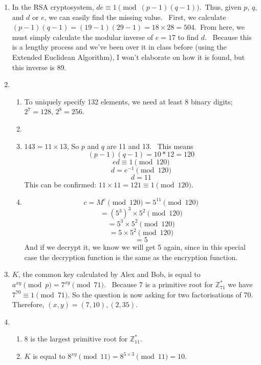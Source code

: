 \documentclass[12pt,letterpaper]{article}
\begin{document}
\pagestyle{fancy}
\rhead{\today}

\begin{enumerate}

    \item
        In the RSA cryptosystem, $de\equiv 1 \pmod {(p-1)(q-1)}$.~Thus, given $p$, $q$, and $d$ or $e$, we can easily find the missing value.~
        First, we calculate $(p-1)(q-1) = (19-1)(29-1) = 18\times28 = 504$.~From here, we must simply calculate the modular inverse of $e = 17$ to find $d$.~
        Because this is a lengthy process and we've been over it in class before (using the Extended Euclidean Algorithm), I won't elaborate on how it is found, but this inverse is 89.

    \item
        \begin{enumerate}
            \item
                To uniquely specify 132 elements, we need at least 8 binary digits; $2^7=128$, $2^8=256$.
            \item
            \item
                $143 = 11 \times 13$, 
                So $p$ and $q$ are 11 and 13.~
                This means
                $$(p-1)(q-1) = 10 * 12 = 120$$
                $$ed \equiv 1 \pmod {120}$$
                $$d = e^{-1} \pmod {120}$$
                $$d = 11$$
                This can be confirmed: $11 \times 11 = 121 \equiv 1 \pmod {120}$.
            \item
                $$c = M^e \pmod {120} = 5^{11} \pmod {120}$$
                $$ = (5^3)^3 \times 5^2 \pmod {120}$$
                $$ = 5^3 \times 5^2 \pmod {120}$$
                $$ = 5 \times 5^2 \pmod {120}$$
                $$ = 5$$
                And if we decrypt it, we know we will get 5 again, since in this special case the decryption function is the same as the encryption function.

        \end{enumerate}

    \item
        $K$, the common key calculated by Alex and Bob, is equal to $a^{xy}\pmod {p} = 7^{xy} \pmod {71}$.~
        Because 7 is a primitive root for $\mathbb{Z}^*_{71}$ we have $7^{70} \equiv 1 \pmod {71}$.
        So the question is now asking for two factorisations of 70.~
        Therefore, $(x,y) = {(7, 10), (2, 35)}$.

    \item
        \begin{enumerate}
            \item
                8 is the largest primitive root for $\mathbb{Z}^*_{11}$.~ %
            \item
                $K$ is equal to $8^{xy} \pmod {11} = 8^{5 \times 3} \pmod {11} = 10$.
        \end{enumerate}


\end{enumerate}
\end{document}
